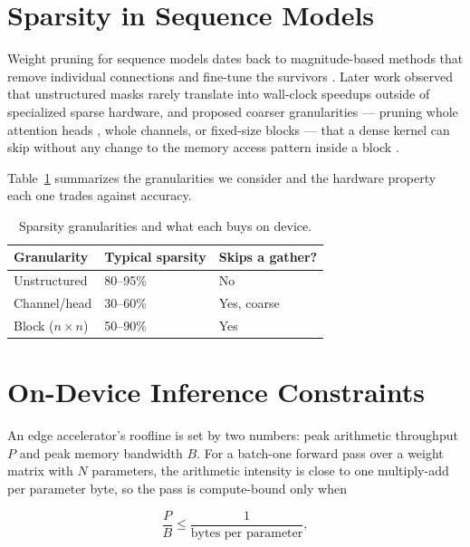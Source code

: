 \documentclass[11pt,twoside]{book}
\begin{document}
\section{Sparsity in Sequence Models}
\label{sec:sparsity-bg}

Weight pruning for sequence models dates back to magnitude-based methods
that remove individual connections and fine-tune the survivors
\cite{han2015pruning}. Later work observed that unstructured masks rarely
translate into wall-clock speedups outside of specialized sparse
hardware, and proposed coarser granularities --- pruning whole attention
heads \cite{michel2019heads}, whole channels, or fixed-size blocks --- that
a dense kernel can skip without any change to the memory access pattern
inside a block \cite{gray2017blocksparse}.

Table~\ref{tab:sparsity-methods} summarizes the granularities we
consider and the hardware property each one trades against accuracy.

\begin{table}[t]
  \centering
  \caption{Sparsity granularities and what each buys on device.}
  \label{tab:sparsity-methods}
  \begin{tabular}{lll}
    \toprule
    Granularity & Typical sparsity & Skips a gather? \\
    \midrule
    Unstructured & 80--95\% & No \\
    Channel/head & 30--60\% & Yes, coarse \\
    Block ($n\times n$) & 50--90\% & Yes \\
    \bottomrule
  \end{tabular}
\end{table}

\section{On-Device Inference Constraints}
\label{sec:ondevice-bg}

An edge accelerator's roofline is set by two numbers: peak arithmetic
throughput \(P\) and peak memory bandwidth \(B\). For a batch-one forward
pass over a weight matrix with \(N\) parameters, the arithmetic intensity
is close to one multiply-add per parameter byte, so the pass is compute-bound
only when

\begin{equation}
  \label{eq:roofline}
  \frac{P}{B} \le \frac{1}{\text{bytes per parameter}},
\end{equation}
\end{document}
